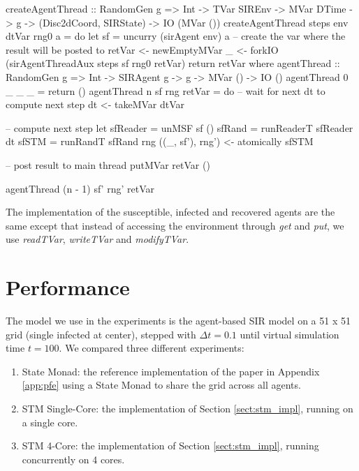 \begin{HaskellCode}
createAgentThread :: RandomGen g 
                  => Int 
                  -> TVar SIREnv
                  -> MVar DTime
                  -> g
                  -> (Disc2dCoord, SIRState)
                  -> IO (MVar ())
createAgentThread steps env dtVar rng0 a = do
    let sf = uncurry (sirAgent env) a
    -- create the var where the result will be posted to
    retVar <- newEmptyMVar
    _ <- forkIO (sirAgentThreadAux steps sf rng0 retVar)
    return retVar
  where
    agentThread :: RandomGen g 
                => Int
                -> SIRAgent g
                -> g
                -> MVar ()
                -> IO ()
    agentThread 0 _ _ _ = return ()
    agentThread n sf rng retVar = do
      -- wait for next dt to compute next step
      dt <- takeMVar dtVar

      -- compute next step
      let sfReader = unMSF sf ()
          sfRand   = runReaderT sfReader dt
          sfSTM    = runRandT sfRand rng
      ((_, sf'), rng') <- atomically sfSTM 
      
      -- post result to main thread
      putMVar retVar ()
      
      agentThread (n - 1) sf' rng' retVar
\end{HaskellCode}

The implementation of the susceptible, infected and recovered agents are the same except that instead of accessing the environment through \textit{get} and \textit{put}, we use \textit{readTVar}, \textit{writeTVar} and \textit{modifyTVar}.

\section{Performance}
\label{sect:stm_perf}
The model we use in the experiments is the agent-based SIR model on a 51 x 51 grid (single infected at center), stepped with $\Delta t = 0.1$ until virtual simulation time $t=100$. We compared three different experiments:

\begin{enumerate}
	\item State Monad: the reference implementation of the paper in Appendix \ref{app:pfe} using a State Monad to share the grid across all agents.
	\item STM Single-Core: the implementation of Section \ref{sect:stm_impl}, running on a single core.
	\item STM 4-Core: the implementation of Section \ref{sect:stm_impl}, running concurrently on 4 cores.
\end{enumerate}

